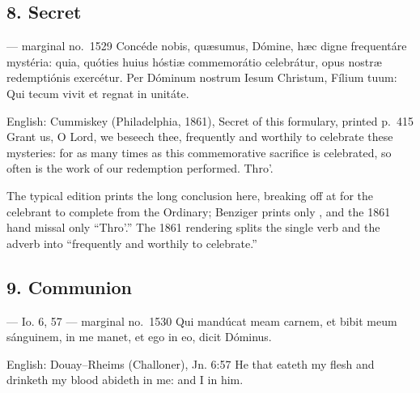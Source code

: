 \elementguard
\subsection*{8. Secret }

\begin{appointedlatin}{ --- marginal no.\ 1529}
Concéde nobis, quæsumus, Dómine, hæc digne frequentáre mystéria: quia,
quóties huius hóstiæ commemorátio celebrátur, opus nostræ redemptiónis
exercétur. Per Dóminum nostrum Iesum Christum, Fílium tuum: Qui tecum vivit et
regnat in unitáte.
\end{appointedlatin}

\begin{namedtranslation}{English: Cummiskey (Philadelphia, 1861), Secret of this formulary, printed p.~415}
Grant us, O Lord, we beseech thee, frequently and worthily to celebrate these
mysteries: for as many times as this commemorative sacrifice is celebrated, so
often is the work of our redemption performed. Thro'.
\end{namedtranslation}

The typical edition prints the long conclusion here, breaking off at
 for the celebrant to complete from the Ordinary; Benziger
prints only , and the 1861 hand missal only ``Thro'.'' The
1861 rendering splits the single verb  and the adverb
 into ``frequently and worthily to celebrate.''


\elementguard
\subsection*{9. Communion }

\begin{appointedlatin}{ --- Io. 6, 57 --- marginal no.\ 1530}
Qui mandúcat meam carnem, et bibit meum sánguinem, in me manet, et ego in eo,
dicit Dóminus.
\end{appointedlatin}

\begin{namedtranslation}{English: Douay--Rheims (Challoner), Jn. 6:57}
He that eateth my flesh and drinketh my blood abideth in me: and I in him.
\end{namedtranslation}

